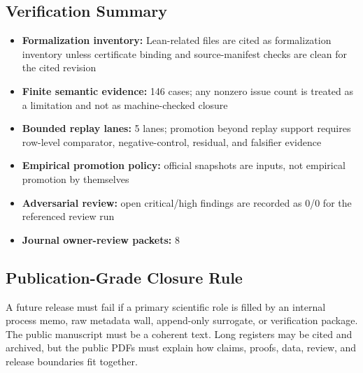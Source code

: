 \subsection{Verification Summary}

\begin{itemize}[leftmargin=1.8em]

\item \textbf{Formalization inventory:} Lean-related files are cited as formalization inventory unless certificate binding and source-manifest checks are clean for the cited revision

\item \textbf{Finite semantic evidence:} 146 cases; any nonzero issue count is treated as a limitation and not as machine-checked closure

\item \textbf{Bounded replay lanes:} 5 lanes; promotion beyond replay support requires row-level comparator, negative-control, residual, and falsifier evidence

\item \textbf{Empirical promotion policy:} official snapshots are inputs, not empirical promotion by themselves

\item \textbf{Adversarial review:} open critical/high findings are recorded as 0/0 for the referenced review run

\item \textbf{Journal owner-review packets:} 8

\end{itemize}

\subsection{Publication-Grade Closure Rule}

A future release must fail if a primary scientific role is filled by an internal process memo, raw metadata wall, append-only surrogate, or verification package. The public manuscript must be a coherent text. Long registers may be cited and archived, but the public PDFs must explain how claims, proofs, data, review, and release boundaries fit together.
